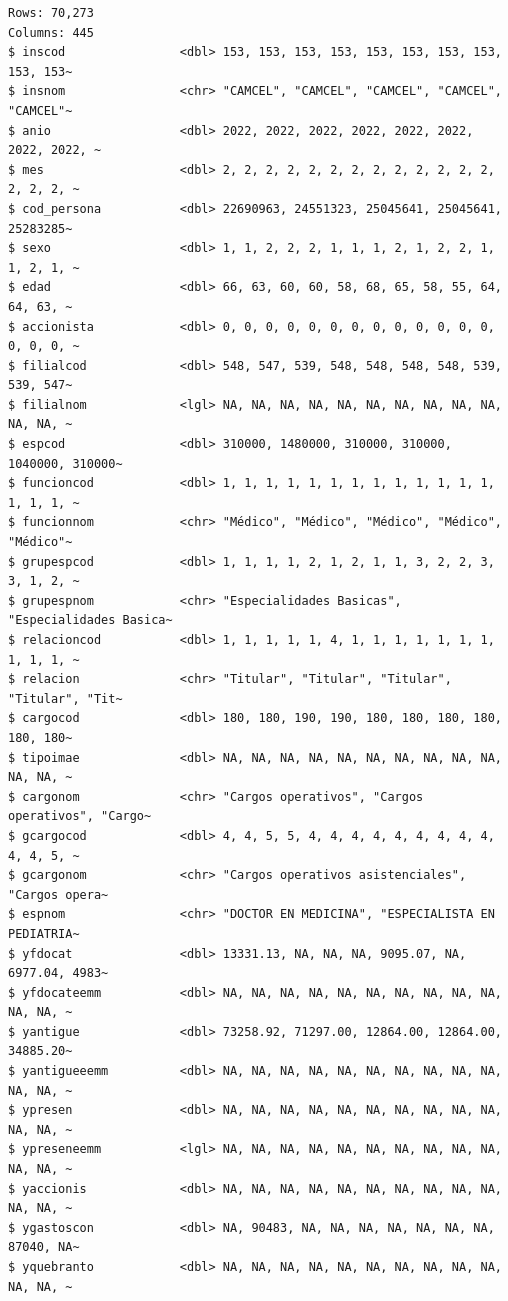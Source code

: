 \documentclass[
  letterpaper,
  DIV=11,
  numbers=noendperiod]{scrreprt}
\begin{document}
\begin{verbatim}
Rows: 70,273
Columns: 445
$ inscod                <dbl> 153, 153, 153, 153, 153, 153, 153, 153, 153, 153~
$ insnom                <chr> "CAMCEL", "CAMCEL", "CAMCEL", "CAMCEL", "CAMCEL"~
$ anio                  <dbl> 2022, 2022, 2022, 2022, 2022, 2022, 2022, 2022, ~
$ mes                   <dbl> 2, 2, 2, 2, 2, 2, 2, 2, 2, 2, 2, 2, 2, 2, 2, 2, ~
$ cod_persona           <dbl> 22690963, 24551323, 25045641, 25045641, 25283285~
$ sexo                  <dbl> 1, 1, 2, 2, 2, 1, 1, 1, 2, 1, 2, 2, 1, 1, 2, 1, ~
$ edad                  <dbl> 66, 63, 60, 60, 58, 68, 65, 58, 55, 64, 64, 63, ~
$ accionista            <dbl> 0, 0, 0, 0, 0, 0, 0, 0, 0, 0, 0, 0, 0, 0, 0, 0, ~
$ filialcod             <dbl> 548, 547, 539, 548, 548, 548, 548, 539, 539, 547~
$ filialnom             <lgl> NA, NA, NA, NA, NA, NA, NA, NA, NA, NA, NA, NA, ~
$ espcod                <dbl> 310000, 1480000, 310000, 310000, 1040000, 310000~
$ funcioncod            <dbl> 1, 1, 1, 1, 1, 1, 1, 1, 1, 1, 1, 1, 1, 1, 1, 1, ~
$ funcionnom            <chr> "Médico", "Médico", "Médico", "Médico", "Médico"~
$ grupespcod            <dbl> 1, 1, 1, 1, 2, 1, 2, 1, 1, 3, 2, 2, 3, 3, 1, 2, ~
$ grupespnom            <chr> "Especialidades Basicas", "Especialidades Basica~
$ relacioncod           <dbl> 1, 1, 1, 1, 1, 4, 1, 1, 1, 1, 1, 1, 1, 1, 1, 1, ~
$ relacion              <chr> "Titular", "Titular", "Titular", "Titular", "Tit~
$ cargocod              <dbl> 180, 180, 190, 190, 180, 180, 180, 180, 180, 180~
$ tipoimae              <dbl> NA, NA, NA, NA, NA, NA, NA, NA, NA, NA, NA, NA, ~
$ cargonom              <chr> "Cargos operativos", "Cargos operativos", "Cargo~
$ gcargocod             <dbl> 4, 4, 5, 5, 4, 4, 4, 4, 4, 4, 4, 4, 4, 4, 4, 5, ~
$ gcargonom             <chr> "Cargos operativos asistenciales", "Cargos opera~
$ espnom                <chr> "DOCTOR EN MEDICINA", "ESPECIALISTA EN PEDIATRIA~
$ yfdocat               <dbl> 13331.13, NA, NA, NA, 9095.07, NA, 6977.04, 4983~
$ yfdocateemm           <dbl> NA, NA, NA, NA, NA, NA, NA, NA, NA, NA, NA, NA, ~
$ yantigue              <dbl> 73258.92, 71297.00, 12864.00, 12864.00, 34885.20~
$ yantigueeemm          <dbl> NA, NA, NA, NA, NA, NA, NA, NA, NA, NA, NA, NA, ~
$ ypresen               <dbl> NA, NA, NA, NA, NA, NA, NA, NA, NA, NA, NA, NA, ~
$ ypreseneemm           <lgl> NA, NA, NA, NA, NA, NA, NA, NA, NA, NA, NA, NA, ~
$ yaccionis             <dbl> NA, NA, NA, NA, NA, NA, NA, NA, NA, NA, NA, NA, ~
$ ygastoscon            <dbl> NA, 90483, NA, NA, NA, NA, NA, NA, NA, 87040, NA~
$ yquebranto            <dbl> NA, NA, NA, NA, NA, NA, NA, NA, NA, NA, NA, NA, ~

\end{verbatim}
\end{document}
